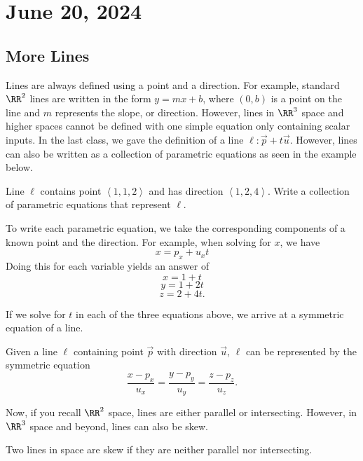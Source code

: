 \chapter{June 20, 2024}

\section{More Lines}

Lines are always defined using a point and a direction. For example, standard $\RR^{2}$ lines are written in the form $y = mx + b$, where $(0, b)$ is a point on the line and $m$ represents the slope, or direction. However, lines in $\RR^{3}$ space and higher spaces cannot be defined with one simple equation only containing scalar inputs. In the last class, we gave the definition of a line $\ell : \vec{p} + t\vec{u}$. However, lines can also be written as a collection of parametric equations as seen in the example below.

\begin{example}
    Line $\ell$ contains point $\left<1, 1, 2\right>$ and has direction $\left<1, 2, 4\right>$. Write a collection of parametric equations that represent $\ell$.

    \begin{soln}
        To write each parametric equation, we take the corresponding components of a known point and the direction. For example, when solving for $x$, we have
        \[x = p_{x} + u_{x}t\]
        Doing this for each variable yields an answer of
        \[x = 1 + t\]
        \[y = 1 + 2t\]
        \[z = 2 + 4t.\]
    \end{soln}
\end{example}

If we solve for $t$ in each of the three equations above, we arrive at a symmetric equation of a line.

\begin{corollary}
    Given a line $\ell$ containing point $\vec{p}$ with direction $\vec{u}$, $\ell$ can be represented by the symmetric equation
    \[\frac{x - p_{x}}{u_{x}} = \frac{y - p_{y}}{u_{y}} = \frac{z - p_{z}}{u_{z}}.\]
\end{corollary}

Now, if you recall $\RR^{2}$ space, lines are either parallel or intersecting. However, in $\RR^{3}$ space and beyond, lines can also be skew.

\begin{definition}
    Two lines in space are skew if they are neither parallel nor intersecting.
\end{definition}

